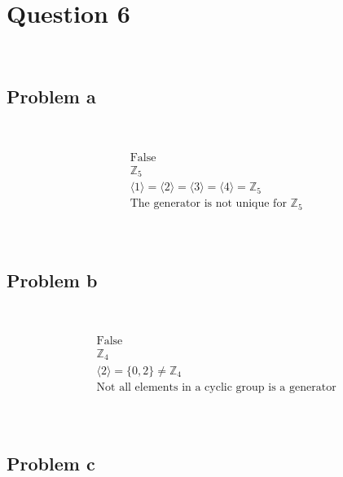 \documentclass{article}
\begin{document}
\newpage

\section*{Question 6}

~

\subsection*{Problem a}

~

\begin{equation*}
    \begin{split}
        &\text{False}\\
        &\mathbb{Z} _5\\
        &\langle1\rangle=\langle2\rangle=\langle3\rangle=\langle4\rangle=\mathbb{Z} _5\\
        &\text{The generator is not unique for }\mathbb{Z} _5\\
    \end{split}
\end{equation*}

~

\subsection*{Problem b}

~

\begin{equation*}
    \begin{split}
        &\text{False}\\
        &\mathbb{Z}_4\\
        &\langle2\rangle=\{0,2\}\ne\mathbb{Z}_4\\
        &\text{Not all elements in a cyclic group is a generator}\\
    \end{split}
\end{equation*}

~

\subsection*{Problem c}

~
\end{document}
